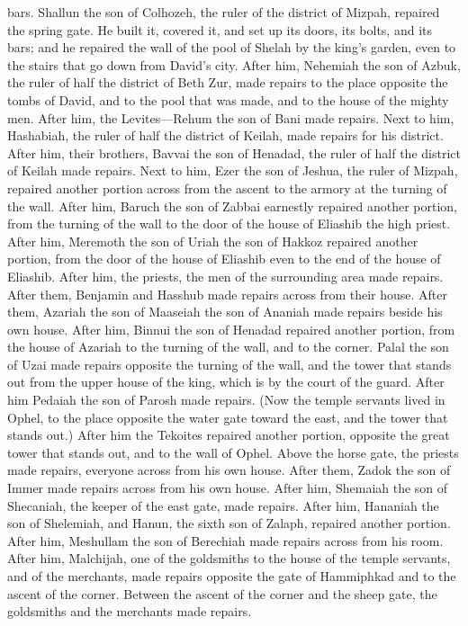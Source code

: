 bars.  Shallun the son of Colhozeh, the ruler of the
district of Mizpah, repaired the spring gate. He built it, covered it,
and set up its doors, its bolts, and its bars; and he repaired the wall
of the pool of Shelah by the king's garden, even to the stairs that go
down from David's city.  After him, Nehemiah the son of
Azbuk, the ruler of half the district of Beth Zur, made repairs to the
place opposite the tombs of David, and to the pool that was made, and to
the house of the mighty men.  After him, the
Levites---Rehum the son of Bani made repairs. Next to him, Hashabiah,
the ruler of half the district of Keilah, made repairs for his district.
 After him, their brothers, Bavvai the son of Henadad,
the ruler of half the district of Keilah made repairs. 
Next to him, Ezer the son of Jeshua, the ruler of Mizpah, repaired
another portion across from the ascent to the armory at the turning of
the wall.  After him, Baruch the son of Zabbai earnestly
repaired another portion, from the turning of the wall to the door of
the house of Eliashib the high priest.  After him,
Meremoth the son of Uriah the son of Hakkoz repaired another portion,
from the door of the house of Eliashib even to the end of the house of
Eliashib.  After him, the priests, the men of the
surrounding area made repairs.  After them, Benjamin and
Hasshub made repairs across from their house. After them, Azariah the
son of Maaseiah the son of Ananiah made repairs beside his own house.
 After him, Binnui the son of Henadad repaired another
portion, from the house of Azariah to the turning of the wall, and to
the corner.  Palal the son of Uzai made repairs opposite
the turning of the wall, and the tower that stands out from the upper
house of the king, which is by the court of the guard. After him Pedaiah
the son of Parosh made repairs.  (Now the temple servants
lived in Ophel, to the place opposite the water gate toward the east,
and the tower that stands out.)  After him the Tekoites
repaired another portion, opposite the great tower that stands out, and
to the wall of Ophel.  Above the horse gate, the priests
made repairs, everyone across from his own house.  After
them, Zadok the son of Immer made repairs across from his own house.
After him, Shemaiah the son of Shecaniah, the keeper of the east gate,
made repairs.  After him, Hananiah the son of Shelemiah,
and Hanun, the sixth son of Zalaph, repaired another portion. After him,
Meshullam the son of Berechiah made repairs across from his room.
 After him, Malchijah, one of the goldsmiths to the house
of the temple servants, and of the merchants, made repairs opposite the
gate of Hammiphkad and to the ascent of the corner. 
Between the ascent of the corner and the sheep gate, the goldsmiths and
the merchants made repairs.

